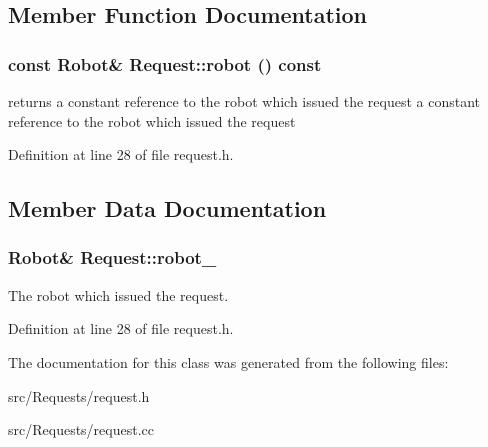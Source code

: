 \subsection{Member Function Documentation}
\hypertarget{class_request_4bb10126bc0069cd7aa4dfe2f6d6c3fe}{
\subsubsection[robot]{\setlength{\rightskip}{0pt plus 5cm}const Robot\& Request::robot () const}}
\label{class_request_4bb10126bc0069cd7aa4dfe2f6d6c3fe}


returns a constant reference to the robot which issued the request  a constant reference to the robot which issued the request 

Definition at line 28 of file request.h.

\subsection{Member Data Documentation}
\hypertarget{class_request_2dcc3df8dd7a258caf4c605962581e8d}{
\subsubsection[robot\_\-]{\setlength{\rightskip}{0pt plus 5cm}Robot\& {\bf Request::robot\_\-}}}
\label{class_request_2dcc3df8dd7a258caf4c605962581e8d}


The robot which issued the request. 

Definition at line 28 of file request.h.

The documentation for this class was generated from the following files:\begin{CompactItemize}
\item 
src/Requests/request.h\item 
src/Requests/request.cc\end{CompactItemize}
